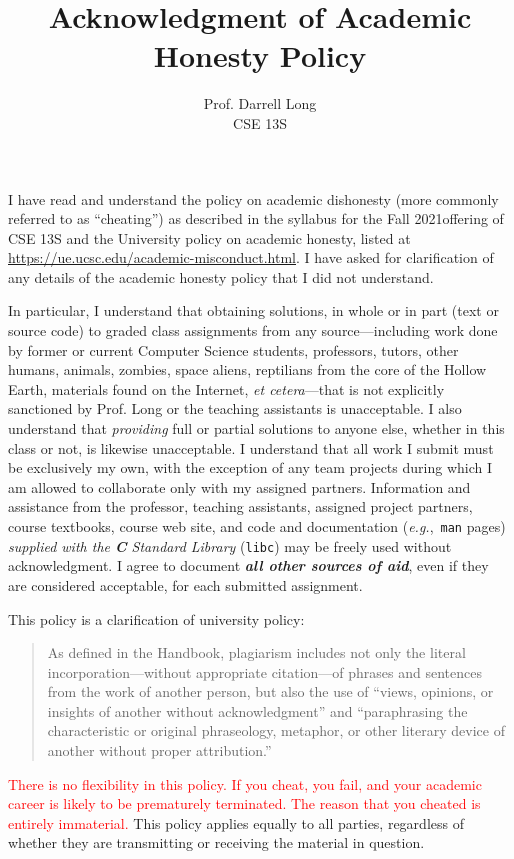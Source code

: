 \documentclass{article}
\title{Acknowledgment of Academic Honesty Policy}
\author{Prof.\xspace Darrell Long \\
CSE 13S}
\date{\quarter}
\newcommand{\surl}[1]{{\fontsize{9}{11}\selectfont\url{#1}}}
\newcommand{\quarter}{Fall 2021}
\begin{document}
\maketitle

I have read and understand the policy on academic dishonesty (more
commonly referred to as ``cheating'') as described in the syllabus for
the \quarter offering of CSE 13S and the University policy on academic
honesty, listed at \surl{https://ue.ucsc.edu/academic-misconduct.html}.
I have asked for clarification of any details of the academic honesty
policy that I did not understand.

In particular, I understand that obtaining solutions, in whole or in
part (text or source code) to graded class assignments from any
source---including work done by former or current Computer Science
students, professors, tutors, other humans, animals, zombies, space
aliens, reptilians from the core of the Hollow Earth, materials found on
the Internet, \emph{et cetera}---that is not explicitly sanctioned by
Prof.\xspace Long or the teaching assistants is unacceptable. I also
understand that \emph{providing} full or partial solutions to anyone
else, whether in this class or not, is likewise unacceptable. I
understand that all work I submit must be exclusively my own, with the
exception of any team projects during which I am allowed to collaborate
only with my assigned partners.  Information and assistance from the
professor, teaching assistants, assigned project partners, course
textbooks, course web site, and code and documentation
(\emph{e.g.},~\texttt{man} pages) \emph{supplied with the \textbf{C}
Standard Library} (\texttt{libc}) may be freely used without
acknowledgment.  I agree to document \textbf{\emph{all other sources of
aid}}, even if they are considered acceptable, for each submitted
assignment.

This policy is a clarification of university policy: \begin{quote} As
  defined in the Handbook, plagiarism includes not only the literal
  incorporation---without appropriate citation---of phrases and
  sentences from the work of another person, but also the use of
  ``views, opinions, or insights of another without acknowledgment'' and
  ``paraphrasing the characteristic or original phraseology, metaphor,
  or other literary device of another without proper attribution.''
\end{quote}


\textcolor{red}{There is no flexibility in this policy. If you cheat,
you fail, and your academic career is likely to be prematurely
terminated. The reason that you cheated is entirely immaterial.} This
policy applies equally to all parties, regardless of whether they are
transmitting or receiving the material in question.
\end{document}
